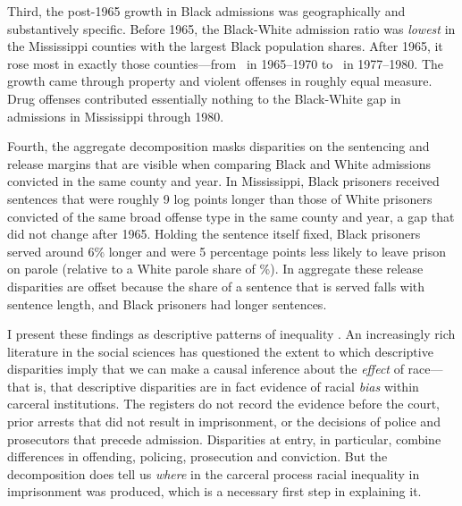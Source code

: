 \documentclass[12pt]{article}
\begin{document}
Third, the post-1965 growth in Black admissions was geographically and substantively specific.  Before 1965, the Black-White admission ratio was \emph{lowest} in the Mississippi counties with the largest Black population shares.  After 1965, it rose most in exactly those counties---from \unskip~in 1965--1970 to \unskip~in 1977--1980.  The growth came through property and violent offenses in roughly equal measure.  Drug offenses contributed essentially nothing to the Black-White gap in admissions in Mississippi through 1980.

Fourth, the aggregate decomposition masks disparities on the sentencing and release margins that are visible when comparing Black and White admissions convicted in the same county and year.  In Mississippi, Black prisoners received sentences that were roughly 9 log points longer than those of White prisoners convicted of the same broad offense type in the same county and year, a gap that did not change after 1965.  Holding the sentence itself fixed, Black prisoners served around 6\% longer and were 5 percentage points less likely to leave prison on parole (relative to a White parole share of \unskip\%).  In aggregate these release disparities are offset because the share of a sentence that is served falls with sentence length, and Black prisoners had longer sentences.

I present these findings as descriptive patterns of inequality \citep{Kreuzer:2009ic}.  An increasingly rich literature in the social sciences has questioned the extent to which descriptive disparities imply that we can make a causal inference about the \emph{effect} of race---that is, that descriptive disparities are in fact evidence of racial \emph{bias} within carceral institutions.  The registers do not record the evidence before the court, prior arrests that did not result in imprisonment, or the decisions of police and prosecutors that precede admission.  Disparities at entry, in particular, combine differences in offending, policing, prosecution and conviction.  But the decomposition does tell us \emph{where} in the carceral process racial inequality in imprisonment was produced, which is a necessary first step in explaining it.
\end{document}
